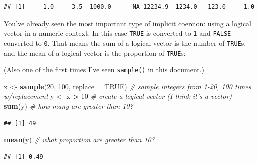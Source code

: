 \documentclass[
]{book}
\newenvironment{Shaded}{\begin{snugshade}}{\end{snugshade}}
\newcommand{\CommentTok}[1]{\textcolor[rgb]{0.56,0.35,0.01}{\textit{#1}}}
\newcommand{\DataTypeTok}[1]{\textcolor[rgb]{0.13,0.29,0.53}{#1}}
\newcommand{\DecValTok}[1]{\textcolor[rgb]{0.00,0.00,0.81}{#1}}
\newcommand{\KeywordTok}[1]{\textcolor[rgb]{0.13,0.29,0.53}{\textbf{#1}}}
\newcommand{\NormalTok}[1]{#1}
\newcommand{\OperatorTok}[1]{\textcolor[rgb]{0.81,0.36,0.00}{\textbf{#1}}}
\newcommand{\OtherTok}[1]{\textcolor[rgb]{0.56,0.35,0.01}{#1}}
\newcommand{\StringTok}[1]{\textcolor[rgb]{0.31,0.60,0.02}{#1}}
\begin{document}
\begin{Shaded}
\end{Shaded}

\begin{verbatim}
## [1]     1.0     3.5  1000.0      NA 12234.9  1234.0   123.0     1.0
\end{verbatim}

You've already seen the most important type of implicit coercion: using a logical vector in a numeric context. In this case \texttt{TRUE} is converted to \texttt{1} and \texttt{FALSE} converted to \texttt{0}.
That means the sum of a logical vector is the number of \texttt{TRUE}s, and the mean of a logical vector is the proportion of \texttt{TRUE}s:

(Also one of the first times I've seen \texttt{sample()} in this document.)

\begin{Shaded}
\begin{Highlighting}[]
\NormalTok{x <-}\StringTok{ }\KeywordTok{sample}\NormalTok{(}\DecValTok{20}\NormalTok{, }\DecValTok{100}\NormalTok{, }\DataTypeTok{replace =} \OtherTok{TRUE}\NormalTok{) }\CommentTok{# sample integers from 1-20, 100 times w/replacement}
\NormalTok{y <-}\StringTok{ }\NormalTok{x }\OperatorTok{>}\StringTok{ }\DecValTok{10} \CommentTok{# create a logical vector (I think it's a vector)}
\KeywordTok{sum}\NormalTok{(y)  }\CommentTok{# how many are greater than 10?}
\end{Highlighting}
\end{Shaded}

\begin{verbatim}
## [1] 49
\end{verbatim}

\begin{Shaded}
\begin{Highlighting}[]
\KeywordTok{mean}\NormalTok{(y) }\CommentTok{# what proportion are greater than 10?}
\end{Highlighting}
\end{Shaded}

\begin{verbatim}
## [1] 0.49
\end{verbatim}
\end{document}
